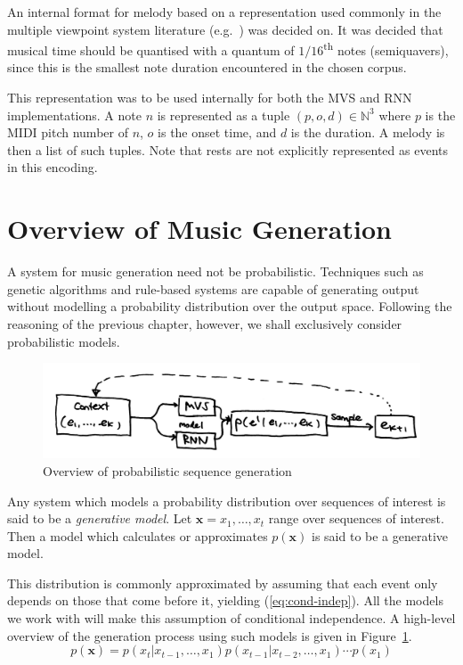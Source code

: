\documentclass[12pt,a4paper,twoside,openright]{report}
\newcommand{\vect}[1]{\boldsymbol{\mathbf{#1}}}
\begin{document}
An internal format for melody based on a representation used commonly in the
multiple viewpoint system literature (e.g.\ \cite{conklin1995viewpoints}) was
decided on. It was decided that musical time should be quantised with a quantum
of $1/16$\textsuperscript{th} notes (semiquavers), since this is the smallest
note duration encountered in the chosen corpus.

This representation was to be used internally for both the MVS and
RNN implementations. A note $n$ is represented as a tuple $(p,o,d) \in
\mathbb{N}^3$ where $p$ is the MIDI pitch number of $n$, $o$ is the onset 
time, and $d$ is the duration. A melody is then a list of such tuples. Note that
rests are not explicitly represented as events in this encoding.

\section{Overview of Music Generation}\label{sec:gen-models}

A system for music generation need not be probabilistic. Techniques such as
genetic algorithms and rule-based systems are capable of generating output
without modelling a probability distribution over the output space. Following
the reasoning of the previous chapter, however, we shall exclusively consider
probabilistic models. 

\begin{figure}[H]
\centering
\includegraphics[width=400pt]{figs/high_level_tmp.jpg}
\caption{Overview of probabilistic sequence generation}
\label{fig:seq-gen-overview}
\end{figure}

Any system which models a probability distribution over sequences of interest is
said to be a \emph{generative model}. Let $\vect{x} = x_1, \ldots, x_t$ range
over sequences of interest. Then a model which calculates or approximates
$p(\vect{x})$ is said to be a generative model.

This distribution is commonly approximated by assuming that each event only
depends on those that come before it, yielding (\ref{eq:cond-indep}). All the
models we work with will make this assumption of conditional independence. A
high-level overview of the generation process using such models is given in
Figure~\ref{fig:seq-gen-overview}.
\begin{equation}
  p(\vect{x}) = p(x_t | x_{t-1}, \ldots, x_1) p(x_{t-1} | x_{t-2},
  \ldots, x_1) \cdots p(x_1) \label{eq:cond-indep}
\end{equation} 
\end{document}
